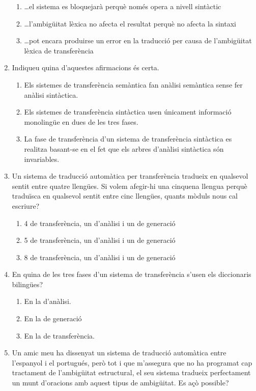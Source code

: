 \begin{enumerate}
\begin{enumerate}
\item {\ldots}el sistema es bloquejarà perquè només opera a nivell
      sintàctic
\item {\ldots}l'ambigüitat lèxica no afecta el resultat perquè no
      afecta la sintaxi
\item {\ldots}pot encara produirse un error en la traducció
      per causa de l'ambigüitat lèxica de transferència
\end{enumerate}

\item 
   Indiqueu quina d'aquestes afirmacions és certa.
   
\begin{enumerate}
\item Els sistemes de transferència semàntica fan
     anàlisi semàntica sense fer anàlisi sintàctica.
\item Els sistemes de transferència sintàctica usen únicament 
     informació monolingüe en dues de les tres fases.
\item La fase de transferència d'un sistema de transferència
     sintàctica es realitza basant-se en el fet que els arbres
     d'anàlisi sintàctica són invariables.
\end{enumerate}
\item Un sistema de traducció automàtica per transferència tradueix en
qualsevol sentit entre quatre llengües. Si volem afegir-hi una
cinquena llengua perquè traduïsca en qualsevol sentit entre cinc
llengües, quants mòduls nous cal escriure?
\begin{enumerate}
\item 4 de transferència, un d'anàlisi i un de generació
\item 5 de transferència, un d'anàlisi i un de generació
\item 8 de transferència, un d'anàlisi i un de generació
\end{enumerate}

\item En quina de les tres fases d'un sistema de transferència s'usen
els diccionaris bilingües?
\begin{enumerate}
\item En la d'anàlisi.
\item En la de generació
\item En la de transferència.
\end{enumerate}


\item 
Un amic meu ha dissenyat un sistema de traducció automàtica entre
l'espanyol i el portugués, però tot i que m'assegura que no ha
programat cap tractament de l'ambigüitat estructural, el seu sistema
tradueix perfectament un munt d'oracions amb aquest tipus de
ambigüitat. Es açò possible? 


\end{enumerate}
